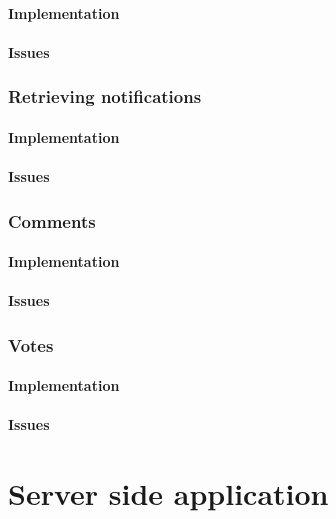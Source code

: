 \paragraph*{Implementation}

\paragraph*{Issues}


\subsubsection*{Retrieving notifications}

\paragraph*{Implementation}

\paragraph*{Issues}


\subsubsection*{Comments}

\paragraph*{Implementation}

\paragraph*{Issues}


\subsubsection*{Votes}

\paragraph*{Implementation}

\paragraph*{Issues}



\section{Server side application}


